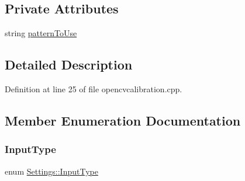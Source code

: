 \subsection*{Private Attributes}
\begin{DoxyCompactItemize}
\item 
string \mbox{\hyperlink{classSettings_ae8df4a531058c0dc6b544aff531e55ef}{pattern\+To\+Use}}
\end{DoxyCompactItemize}


\subsection{Detailed Description}


Definition at line 25 of file opencvcalibration.\+cpp.



\subsection{Member Enumeration Documentation}
\mbox{\label{classSettings_a5afe85d24b071973a7f248c05386f7f4}} 
\subsubsection{\texorpdfstring{InputType}{InputType}}
{\footnotesize\ttfamily enum \mbox{\hyperlink{classSettings_a5afe85d24b071973a7f248c05386f7f4}{Settings\+::\+Input\+Type}}}

